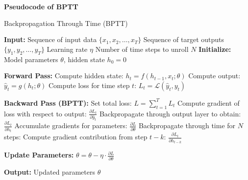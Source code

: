 \documentclass[12pt,a4paper]{article}
\begin{document}
\newpage
\textbf{Pseudocode of BPTT} \parencite{wikipedia2023bptt}
\begin{algorithm}[H]
    \caption{Backpropagation Through Time (BPTT)}
    \begin{algorithmic}[1]
    \STATE \textbf{Input:} 
    \STATE \hspace{1em} Sequence of input data $\{x_1, x_2, \dots, x_T\}$
    \STATE \hspace{1em} Sequence of target outputs $\{y_1, y_2, \dots, y_T\}$
    \STATE \hspace{1em} Learning rate $\eta$
    \STATE \hspace{1em} Number of time steps to unroll $N$
    \STATE \textbf{Initialize:} Model parameters $\theta$, hidden state $h_0 = 0$
    
    \STATE \textbf{Forward Pass:}
        \STATE Compute hidden state: $h_t = f(h_{t-1}, x_t; \theta)$
        \STATE Compute output: $\hat{y}_t = g(h_t; \theta)$
        \STATE Compute loss for time step $t$: $L_t = \mathcal{L}(\hat{y}_t, y_t)$
    \ENDFOR
    
    \STATE \textbf{Backward Pass (BPTT):}
    \STATE Set total loss: $L = \sum_{t=1}^{T} L_t$
        \STATE Compute gradient of loss with respect to output: $\frac{\partial L_t}{\partial \hat{y}_t}$
        \STATE Backpropagate through output layer to obtain: $\frac{\partial L_t}{\partial h_t}$
        \STATE Accumulate gradients for parameters: $\frac{\partial L}{\partial \theta}$
            \STATE Backpropagate through time for $N$ steps:
            \STATE Compute gradient contribution from step $t-k$: $\frac{\partial L_t}{\partial h_{t-k}}$
        \ENDFOR
    \ENDFOR
    
    \STATE \textbf{Update Parameters:}
    \STATE $\theta = \theta - \eta \cdot \frac{\partial L}{\partial \theta}$
    
    \STATE \textbf{Output:} Updated parameters $\theta$
    \end{algorithmic}
\end{algorithm}
\end{document}
